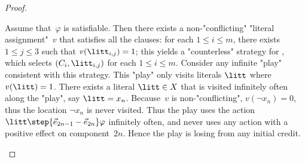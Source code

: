 \begin{proof}
\begin{scope}
    Assume that~$\varphi$ is satisfiable.  Then there exists a
    non-"conflicting" "literal assignment"~$v$ that satisfies all the
    clauses: for each $1\leq i\leq m$, there exists $1\leq j\leq 3$
    such that $v(\litt_{i,j})=1$; this yields a "counterless" strategy
    for \Adam, which selects $(C_i,\litt_{i,j})$ for each
    $1\leq i\leq m$.  Consider any infinite "play" consistent with
    this strategy.  This "play" only visits literals $\litt$ where
    $v(\litt)=1$.  There exists a literal $\litt\in X$ that is visited
    infinitely often along the "play", say $\litt=x_n$.  Because~$v$ is
    non-"conflicting", $v(\neg x_n)=0$, thus the location $\neg x_n$
    is never visited.  Thus the play uses the action
    $\litt\step{\vec e_{2n-1}-\vec e_{2n}}\varphi$ infinitely often,
    and never uses any action with a positive effect on
    component~$2n$.  Hence the play is losing from any initial credit.


\end{scope}
\end{proof}

